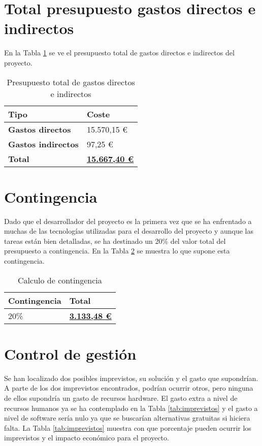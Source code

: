\section{Total presupuesto gastos directos e indirectos}

En la Tabla \ref{tab:preptotaldirindi} se ve el presupuesto total de gastos directos e indirectos del proyecto.

\begin{table}[H]\label{tab:preptotaldirindi}
	\centering
	\begin{tabular}{|l|l|}
		\hline
		\textbf{Tipo}              & \textbf{Coste}                   \\ \hline
		\textbf{Gastos directos}   & 15.570,15 €                      \\ \hline
		\textbf{Gastos indirectos} & 97,25 €                          \\ \hline
		\textbf{Total}             & \textbf{\underline{15.667,40 €}} \\ \hline
	\end{tabular}
	\caption{Presupuesto total de gastos directos e indirectos}
\end{table}

\section{Contingencia}
Dado que el desarrollador del proyecto es la primera vez que se ha enfrentado a muchas de las tecnologías utilizadas para el desarrollo del proyecto y aunque las tareas están bien detalladas, se ha destinado un 20\% del valor total del presupuesto a contingencia. En la Tabla \ref{tab:contingencia} se muestra lo que supone esta contingencia.

\begin{table}[H]\label{tab:contingencia}
	\centering
	\begin{tabular}{|l|l|}
		\hline
		\textbf{Contingencia} & \textbf{Total}                  \\ \hline
		20\%                  & \textbf{\underline{3.133,48 €}} \\ \hline
	\end{tabular}
	\caption{Calculo de contingencia}
\end{table}

\section{Control de gestión}
Se han localizado dos posibles imprevistos, su solución y el gasto que supondrían. A parte de los dos imprevistos encontrados, podrían ocurrir otros, pero ninguna de ellos supondría un gasto de recursos hardware. El gasto extra a nivel de recursos humanos ya se ha contemplado en la Tabla \ref{tab:imprevistos} y el gasto a nivel de software sería nulo ya que se buscarían alternativas gratuitas si hiciera falta. La Tabla \ref{tab:imprevistos} muestra con que porcentaje pueden ocurrir los imprevistos y el impacto económico para el proyecto.

